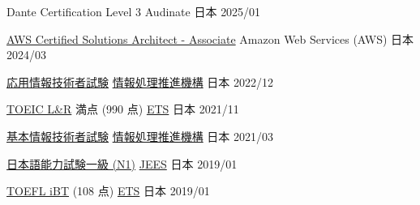 
\begin{cvhonors}

  \cvhonor
  {Dante Certification Level 3} %
  {Audinate} %
  {日本} %
  {2025/01} %

  \cvhonor
  {\href{https://www.credly.com/badges/84c825b1-44c9-448f-9269-f0cb9fd1e15e/public_url}{AWS Certified Solutions Architect - Associate}} %
  {Amazon Web Services (AWS)} %
  {日本} %
  {2024/03} %

  \cvhonor
    {\href{https://www.ipa.go.jp/shiken/kubun/ap.html}{応用情報技術者試験}} %
    {\href{https://www.ipa.go.jp/index.html}{情報処理推進機構}} %
    {日本} %
    {2022/12} %

  \cvhonor
    {\href{https://www.iibc-global.org/toeic.html}{TOEIC L\&R} 満点 (990 点)} %
    {\href{https://www.ets.org/}{ETS}} %
    {日本} %
    {2021/11} %

  \cvhonor
    {\href{https://www.ipa.go.jp/shiken/kubun/fe.html}{基本情報技術者試験}} %
    {\href{https://www.ipa.go.jp/index.html}{情報処理推進機構}} %
    {日本} %
    {2021/03} %

  \cvhonor
    {\href{https://www.jlpt.jp/}{日本語能力試験一級 (N1)}} %
    {\href{http://www.jees.or.jp/}{JEES}} %
    {日本} %
    {2019/01} %

  \cvhonor
    {\href{https://www.ets.org/toefl.html}{TOEFL iBT} (108 点)} %
    {\href{https://www.ets.org/}{ETS}}%
    {日本} %
    {2019/01} %
\end{cvhonors}
